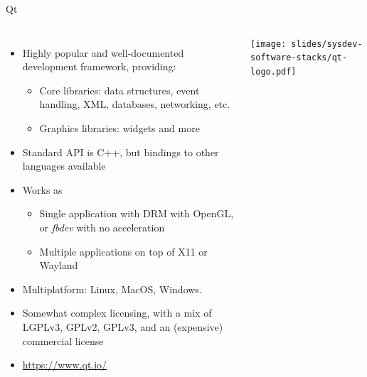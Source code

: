 \begin{frame}{Qt}
  \begin{columns}
  \begin{itemize}
  \item Highly popular and well-documented development framework,
    providing:
    \begin{itemize}
    \item Core libraries: data structures, event handling, XML,
      databases, networking, etc.
    \item Graphics libraries: widgets and more
    \end{itemize}
  \item Standard API is C++, but bindings to other languages available
  \item Works as
    \begin{itemize}
    \item Single application with DRM with OpenGL, or {\em fbdev} with no acceleration
    \item Multiple applications on top of X11 or Wayland
    \end{itemize}
  \item Multiplatform: Linux, MacOS, Windows.
  \item Somewhat complex licensing, with a mix of LGPLv3, GPLv2,
    GPLv3, and an (expensive) commercial license
  \item \url{https://www.qt.io/}
  \end{itemize}
  \texttt{[image: slides/sysdev-software-stacks/qt-logo.pdf]}
  \end{columns}
\end{frame}

